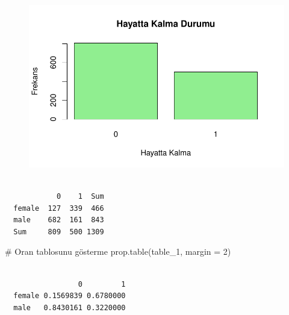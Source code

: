 \documentclass[
  letterpaper,
  DIV=11,
  numbers=noendperiod]{scrartcl}
\newenvironment{Shaded}{\begin{snugshade}}{\end{snugshade}}
\newcommand{\AttributeTok}[1]{\textcolor[rgb]{0.40,0.45,0.13}{#1}}
\newcommand{\CommentTok}[1]{\textcolor[rgb]{0.37,0.37,0.37}{#1}}
\newcommand{\DecValTok}[1]{\textcolor[rgb]{0.68,0.00,0.00}{#1}}
\newcommand{\FunctionTok}[1]{\textcolor[rgb]{0.28,0.35,0.67}{#1}}
\newcommand{\NormalTok}[1]{\textcolor[rgb]{0.00,0.23,0.31}{#1}}
\newcommand{\OtherTok}[1]{\textcolor[rgb]{0.00,0.23,0.31}{#1}}
\newcommand{\SpecialCharTok}[1]{\textcolor[rgb]{0.37,0.37,0.37}{#1}}
\begin{document}
\begin{figure}[H]

{\centering \includegraphics{4_hafta_tanimlayici_istatistik_files/figure-pdf/unnamed-chunk-6-2.pdf}

}

\end{figure}

\begin{Shaded}
\end{Shaded}

\begin{verbatim}
        
            0    1  Sum
  female  127  339  466
  male    682  161  843
  Sum     809  500 1309
\end{verbatim}

\begin{Shaded}
\begin{Highlighting}[]
\CommentTok{\# Oran tablosunu gösterme}
\FunctionTok{prop.table}\NormalTok{(table\_1, }\AttributeTok{margin =} \DecValTok{2}\NormalTok{)}
\end{Highlighting}
\end{Shaded}

\begin{verbatim}
        
                 0         1
  female 0.1569839 0.6780000
  male   0.8430161 0.3220000
\end{verbatim}
\end{document}
